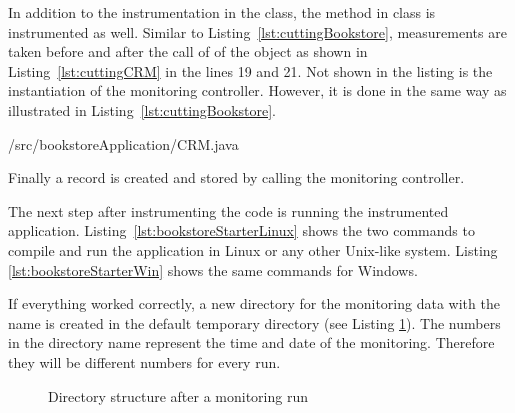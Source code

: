 \noindent In addition to the instrumentation in the  class, the  method in class  is instrumented as well. Similar to Listing~\ref{lst:cuttingBookstore}, measurements are taken before and after the call of  of the  object as shown in Listing~\ref{lst:cuttingCRM} in the lines 19 and 21. Not shown in the listing is the instantiation of the monitoring controller. However, it is done in the same way as illustrated in Listing~\ref{lst:cuttingBookstore}. 

\setJavaCodeListing
%
{\manualInstrumentedBookstoreApplicationDir/src/bookstoreApplication/CRM.java}

\noindent Finally a record is created and stored by calling the monitoring controller.

The next step after instrumenting the code is running the instrumented application. Listing~\ref{lst:bookstoreStarterLinux} shows the two commands to compile and run the application in Linux or any other Unix-like system. Listing \ref{lst:bookstoreStarterWin} shows the same commands for Windows.

\setBashListing 		
	




If everything worked correctly, a new directory for the monitoring data with the name  is created in the default temporary directory (see Listing \ref{fig:logtree}). The numbers in the directory name represent the time and date of the monitoring. Therefore they will be different numbers for every run.

\begin{figure}[H]
\begin{graybox}
\end{graybox}
\caption{Directory structure after a monitoring run}
\label{fig:logtree}
\end{figure}

